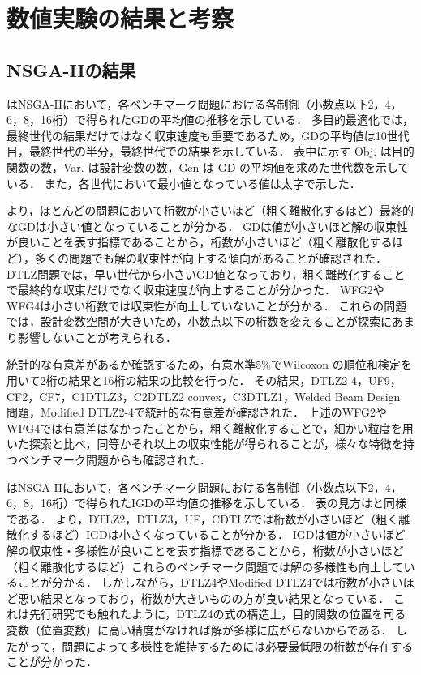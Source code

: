\documentclass[../main/main]{subfiles}
\begin{document}
\section{数値実験の結果と考察}
\subsection{NSGA-IIの結果}
はNSGA-IIにおいて，各ベンチマーク問題における各制御（小数点以下2，4，6，8，16桁）で得られたGDの平均値の推移を示している．
多目的最適化では，最終世代の結果だけではなく収束速度も重要であるため，GDの平均値は10世代目，最終世代の半分，最終世代での結果を示している．
表中に示す Obj. は目的関数の数，Var. は設計変数の数，Gen は GD の平均値を求めた世代数を示している．
また，各世代において最小値となっている値は太字で示した．

より，ほとんどの問題において桁数が小さいほど（粗く離散化するほど）最終的なGDは小さい値となっていることが分かる．
GDは値が小さいほど解の収束性が良いことを表す指標であることから，桁数が小さいほど（粗く離散化するほど），多くの問題でも解の収束性が向上する傾向があることが確認された．
DTLZ問題では，早い世代から小さいGD値となっており，粗く離散化することで最終的な収束だけでなく収束速度が向上することが分かった．
WFG2やWFG4は小さい桁数では収束性が向上していないことが分かる．
これらの問題では，設計変数空間が大きいため，小数点以下の桁数を変えることが探索にあまり影響しないことが考えられる．

統計的な有意差があるか確認するため，有意水準5\%でWilcoxon の順位和検定を用いて2桁の結果と16桁の結果の比較を行った．
その結果，DTLZ2-4，UF9，CF2，CF7，C1DTLZ3，C2DTLZ2 convex，C3DTLZ1，Welded Beam Design 問題，Modified DTLZ2-4で統計的な有意差が確認された．
上述のWFG2やWFG4では有意差はなかったことから，粗く離散化することで，細かい粒度を用いた探索と比べ，同等かそれ以上の収束性能が得られることが，様々な特徴を持つベンチマーク問題からも確認された．

はNSGA-IIにおいて，各ベンチマーク問題における各制御（小数点以下2，4，6，8，16桁）で得られたIGDの平均値の推移を示している．
表の見方はと同様である．
より，DTLZ2，DTLZ3，UF，CDTLZでは桁数が小さいほど（粗く離散化するほど）IGDは小さくなっていることが分かる．
IGDは値が小さいほど解の収束性・多様性が良いことを表す指標であることから，桁数が小さいほど（粗く離散化するほど）これらのベンチマーク問題では解の多様性も向上していることが分かる．
しかしながら，DTLZ4やModified DTLZ4では桁数が小さいほど悪い結果となっており，桁数が大きいものの方が良い結果となっている．
これは先行研究でも触れたように，DTLZ4の式の構造上，目的関数の位置を司る変数（位置変数）に高い精度がなければ解が多様に広がらないからである．
したがって，問題によって多様性を維持するためには必要最低限の桁数が存在することが分かった．
\end{document}
